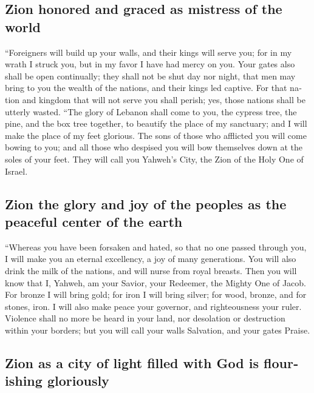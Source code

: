 \begin{paracol}{2}
\begin{otherlanguage}{english}
{\subsection{Zion honored and graced as mistress of the
world}\label{zion-honored-and-graced-as-mistress-of-the-world}}

 ``Foreigners will build up your walls, and their kings
will serve you; for in my wrath I struck you, but in my favor I have had
mercy on you.  Your gates also shall be open continually;
they shall not be shut day nor night, that men may bring to you the
wealth of the nations, and their kings led captive.  For
that nation and kingdom that will not serve you shall perish; yes, those
nations shall be utterly wasted.  ``The glory of Lebanon
shall come to you, the cypress tree, the pine, and the box tree
together, to beautify the place of my sanctuary; and I will make the
place of my feet glorious.  The sons of those who
afflicted you will come bowing to you; and all those who despised you
will bow themselves down at the soles of your feet. They will call you
Yahweh's City, the Zion of the Holy One of Israel.

\hypertarget{zion-the-glory-and-joy-of-the-peoples-as-the-peaceful-center-of-the-earth}{%
\subsection{Zion the glory and joy of the peoples as the peaceful center
of the
earth}\label{zion-the-glory-and-joy-of-the-peoples-as-the-peaceful-center-of-the-earth}}

 ``Whereas you have been forsaken and hated, so that no
one passed through you, I will make you an eternal excellency, a joy of
many generations.  You will also drink the milk of the
nations, and will nurse from royal breasts. Then you will know that I,
Yahweh, am your Savior, your Redeemer, the Mighty One of Jacob.
 For bronze I will bring gold; for iron I will bring
silver; for wood, bronze, and for stones, iron. I will also make peace
your governor, and righteousness your ruler.  Violence
shall no more be heard in your land, nor desolation or destruction
within your borders; but you will call your walls Salvation, and your
gates Praise.

\hypertarget{zion-as-a-city-of-light-filled-with-god-is-flourishing-gloriously}{%
\subsection{Zion as a city of light filled with God is flourishing
gloriously}\label{zion-as-a-city-of-light-filled-with-god-is-flourishing-gloriously}}


\end{otherlanguage}
\end{paracol}

